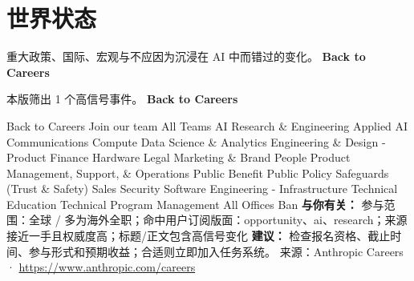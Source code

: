 \documentclass[10.5pt]{ctexart}
\begin{document}
\section*{世界状态}
{\color{ormuted} 重大政策、国际、宏观与不应因为沉浸在 AI 中而错过的变化。}
\vspace{2mm}
{\LARGE\bfseries Back to Careers}\par
\vspace{1mm}
{\color{ormuted} 本版筛出 1 个高信号事件。}
\vspace{3mm}
{\Large\bfseries Back to Careers}\par
Back to Careers Join our team All Teams AI Research \& Engineering Applied AI Communications Compute Data Science \& Analytics Engineering \& Design - Product Finance Hardware Legal Marketing \& Brand People Product Management, Support, \& Operations Public Benefit Public Policy Safeguards (Trust \& Safety) Sales Security Software Engineering - Infrastructure Technical Education Technical Program Management All Offices Ban
\textbf{与你有关：} 参与范围：全球 / 多为海外全职；命中用户订阅版面：opportunity、ai、research；来源接近一手且权威度高；标题/正文包含高信号变化
\textbf{建议：} 检查报名资格、截止时间、参与形式和预期收益；合适则立即加入任务系统。
{\footnotesize\color{ormuted} 来源：Anthropic Careers · \url{https://www.anthropic.com/careers}}
\end{document}
